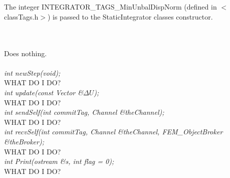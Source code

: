  \\
\\ 
The integer INTEGRATOR\_TAGS\_MinUnbalDispNorm (defined in
$<$classTags.h$>$) is passed to the StaticIntegrator classes
constructor. 


 \\
\\ 
Does nothing. \\

\\

{\em int newStep(void);} \\
WHAT DO I DO?\\

{\em int update(const Vector \&$\Delta U$);} \\
WHAT DO I DO?\\

{\em int sendSelf(int commitTag, Channel \&theChannel); } \\ 
WHAT DO I DO?\\

{\em int recvSelf(int commitTag, Channel \&theChannel, 
FEM\_ObjectBroker \&theBroker); } \\ 
WHAT DO I DO?\\

{\em int Print(ostream \&s, int flag = 0);}\\
WHAT DO I DO?